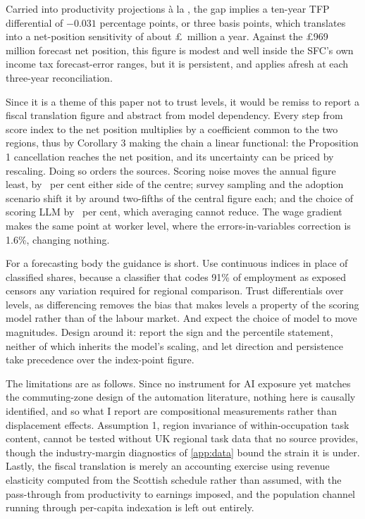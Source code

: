 Carried into productivity projections à la \citet{acemoglu2025}, the gap implies a ten-year TFP differential of $-0.031$ percentage points, or three basis points, which translates into a net-position sensitivity of about \pounds\fiscCen~million a year. Against the \pounds969 million forecast net position, this figure is modest and well inside the SFC's own income tax forecast-error ranges, but it is persistent, and applies afresh at each three-year reconciliation.

Since it is a theme of this paper not to trust levels, it would be remiss to report a fiscal translation figure and abstract from model dependency. Every step from score index to the net position multiplies by a coefficient common to the two regions, thus by Corollary 3 making the chain a linear functional: the Proposition 1 cancellation reaches the net position, and its uncertainty can be priced by rescaling. Doing so orders the sources. Scoring noise moves the annual figure least, by \fiscNoisePct~per cent either side of the centre; survey sampling and the adoption scenario shift it by around two-fifths of the central figure each; and the choice of scoring LLM by \fiscModelPct~per cent, which averaging cannot reduce. The wage gradient makes the same point at worker level, where the errors-in-variables correction is 1.6\%, changing nothing.

For a forecasting body the guidance is short. Use continuous indices in place of classified shares, because a classifier that codes 91\% of employment as exposed censors any variation required for regional comparison. Trust differentials over levels, as differencing removes the bias that makes levels a property of the scoring model rather than of the labour market. And expect the choice of model to move magnitudes. Design around it: report the sign and the percentile statement, neither of which inherits the model's scaling, and let direction and persistence take precedence over the index-point figure.

The limitations are as follows. Since no instrument for AI exposure yet matches the commuting-zone design of the automation literature, nothing here is causally identified, and so what I report are compositional measurements rather than displacement effects. Assumption 1, region invariance of within-occupation task content, cannot be tested without UK regional task data that no source provides, though the industry-margin diagnostics of \cref{app:data} bound the strain it is under. 
Lastly, the fiscal translation is merely an accounting exercise using revenue elasticity computed from the Scottish schedule rather than assumed, with the pass-through from productivity to earnings imposed, and the population channel running through per-capita indexation is left out entirely.

